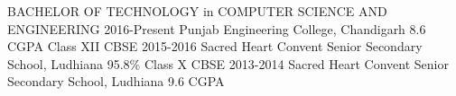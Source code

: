    
\begin{entrylist}
\entry
{BACHELOR OF TECHNOLOGY {\normalfont in COMPUTER SCIENCE AND ENGINEERING }}
{2016-Present}
{Punjab Engineering College, Chandigarh}
{8.6 CGPA}
\entry
{Class XII {\normalfont CBSE}}
{2015-2016}
{Sacred Heart Convent Senior Secondary School, Ludhiana}
{95.8\%}
\entry
{Class X {\normalfont CBSE}}
{2013-2014}
{Sacred Heart Convent Senior Secondary School, Ludhiana}
{9.6 CGPA}

\end{entrylist}